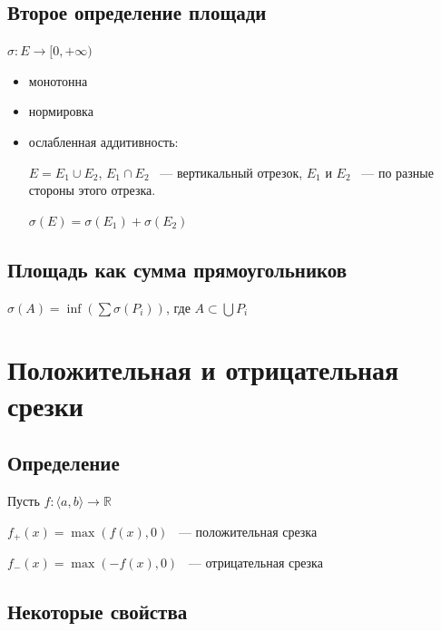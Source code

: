 \documentclass{article}
\begin{document}
		\subsection{Второе определение площади}
			
			$\sigma : E \rightarrow [0, +\infty)$
				
			\begin{itemize}
				
				\item монотонна
					
				\item нормировка
					
				\item ослабленная аддитивность:
					
					$E = E_1 \cup E_2$, $E_1 \cap E_2$ ~--- вертикальный отрезок, $E_1$ и $E_2$ ~--- по разные стороны этого отрезка.
					
					$\sigma(E) = \sigma(E_1) + \sigma(E_2)$
						
			\end{itemize}
	
        \subsection{Площадь как сумма прямоугольников}
            
            $\sigma(A) = \inf \left(\sum \sigma(P_i) \right)$, где $A \subset \bigcup P_i$
	
	\newpage
	
	\section{Положительная и отрицательная срезки}
	
	    \subsection{Определение}
	    
	        Пусть $f : \langle a, b \rangle \rightarrow \mathbb{R}$
	    
	        $f_+ (x) = \max (f(x), 0)$ ~--- положительная срезка
	    
	        $f_- (x) = \max (-f(x), 0)$ ~--- отрицательная срезка
	    
	    \subsection{Некоторые свойства}
	    
\end{document}
